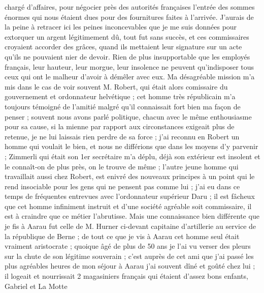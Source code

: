 \documentclass[12pt]{article}
\begin{document}
chargé d’affaires, pour négocier près des autorités françaises l’entrée des sommes énormes qui nous
étaient dues pour des fournitures faites à l’arrivée. J’aurais de la peine à retracer ici les peines
inconcevables que je me suis données pour extorquer un argent légitimement dû, tout fut sans succès,
et ces commissaires croyaient accorder des grâces, quand ils mettaient leur signature sur un acte
qu’ils ne pouvaient nier de devoir. Rien de plus insupportable que les employés français, leur
hauteur, leur morgue, leur insolence ne peuvent qu’indisposer tous ceux qui ont le malheur d’avoir à
démêler avec eux. Ma désagréable mission m’a mis dans le cas de voir souvent M. Robert, qui était
alors comissaire du gouvernement et ordonnateur helvétique ; cet homme très républicain m’a toujours
témoigné de l’amitié malgré qu’il connaissait fort bien ma façon de penser ; souvent nous avons
parlé politique, chacun avec le même enthousiasme pour sa cause, si la mienne par rapport aux
circonstances exigeait plus de retenue, je ne lui laissais rien perdre de sa force ; j’ai reconnu en
Robert un homme qui voulait le bien, et nous ne différions que dans les moyens d’y parvenir ;
Zimmerli qui était son 1er secrétaire m’a déplu, déjà son extérieur est insolent et le connaît-on de
plus près, on le trouve de même ; l’autre jeune homme qui travaillait aussi chez Robert, est enivré
des nouveaux principes à un point qui le rend insociable pour les gens qui ne pensent pas comme lui
; j’ai eu dans ce temps de fréquentes entrevues avec l’ordonnateur supérieur Daru ; il est fâcheux
que cet homme infiniment instruit et d’une société agréable soit commissaire, il est à craindre que
ce métier l’abrutisse. Mais une connaissance bien différente que je fis à Aarau fut celle de M.
Hurner ci-devant capitaine d’artillerie au service de la république de Berne ; de tout ce que je vis
à Aarau cet homme seul était vraiment aristocrate ; quoique âgé de plus de 50 ans je l’ai vu verser
des pleurs sur la chute de son légitime souverain ; c’est auprès de cet ami que j’ai passé les plus
agréables heures de mon séjour à Aarau j’ai souvent dîné et goûté chez lui ; il logeait et
nourrissait 2 magasiniers français qui étaient d’assez bons enfants, Gabriel et La Motte
\end{document}
